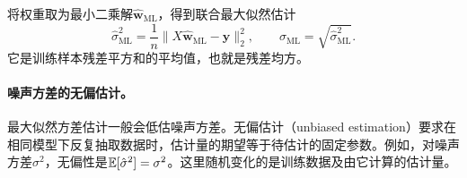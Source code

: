 将权重取为最小二乘解$\hat{\bm w}_{\mathrm{ML}}$，得到联合最大似然估计
\begin{equation}
 \boxed{\hat{\sigma}^2_{\mathrm{ML}}
 =\frac1n\|X\hat{\bm w}_{\mathrm{ML}}-\bm y\|_2^2},
 \qquad
 \hat\sigma_{\mathrm{ML}}=\sqrt{\hat\sigma^2_{\mathrm{ML}}}.
 \label{eq:linear-noise-variance-mle}
\end{equation}
它是训练样本残差平方和的平均值，也就是残差均方。

\paragraph{噪声方差的无偏估计。}
最大似然方差估计一般会低估噪声方差。无偏估计（unbiased estimation）要求在相同模型下反复抽取数据时，估计量的期望等于待估计的固定参数。例如，对噪声方差$\sigma^2$，无偏性是$\mathbb{E}[\hat\sigma^2]=\sigma^2$。这里随机变化的是训练数据及由它计算的估计量。

